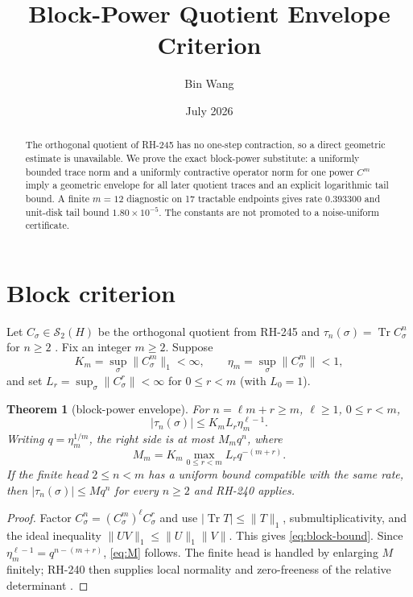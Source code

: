 \documentclass[11pt]{article}
\title{Block-Power Quotient Envelope Criterion}
\author{Bin Wang}
\date{July 2026}
\newtheorem{theorem}{Theorem}
\newcommand{\Tr}{\operatorname{Tr}}
\begin{document}
\maketitle

\begin{abstract}
The orthogonal quotient of RH-245 has no one-step contraction, so a direct
geometric estimate is unavailable.  We prove the exact block-power substitute:
a uniformly bounded trace norm and a uniformly contractive operator norm for
one power $C^m$ imply a geometric envelope for all later quotient traces and
an explicit logarithmic tail bound.  A finite $m=12$ diagnostic on 17
tractable endpoints gives rate $0.393300$ and unit-disk tail bound
$1.80\times10^{-5}$.  The constants are not promoted to a noise-uniform
certificate.
\end{abstract}

\section{Block criterion}

Let $C_\sigma\in\mathcal S_2(H)$ be the orthogonal quotient from RH-245 and
$\tau_n(\sigma)=\Tr C_\sigma^n$ for $n\ge2$ \citep{WangRH245}.  Fix an integer
$m\ge2$.  Suppose
\[
 K_m=\sup_\sigma\|C_\sigma^m\|_1<\infty,
 \qquad
 \eta_m=\sup_\sigma\|C_\sigma^m\|<1,
\]
and set $L_r=\sup_\sigma\|C_\sigma^r\|<\infty$ for
$0\le r<m$ (with $L_0=1$).

\begin{theorem}[block-power envelope]\label{thm:block}
For $n=\ell m+r\ge m$, $\ell\ge1$, $0\le r<m$,
\begin{equation}\label{eq:block-bound}
 |\tau_n(\sigma)|
 \le K_m L_r\eta_m^{\ell-1}.
\end{equation}
Writing $q=\eta_m^{1/m}$, the right side is at most $M_mq^n$, where
\begin{equation}\label{eq:M}
 M_m=K_m\max_{0\le r<m}L_rq^{-(m+r)}.
\end{equation}
If the finite head $2\le n<m$ has a uniform bound compatible with the same
rate, then $|\tau_n(\sigma)|\le Mq^n$ for every $n\ge2$ and RH-240 applies.
\end{theorem}

\begin{proof}
Factor $C_\sigma^n=(C_\sigma^m)^\ell C_\sigma^r$ and use
$|\Tr T|\le\|T\|_1$, submultiplicativity, and the ideal inequality
$\|UV\|_1\le\|U\|_1\|V\|$.  This gives \eqref{eq:block-bound}.  Since
$\eta_m^{\ell-1}=q^{n-(m+r)}$, \eqref{eq:M} follows.  The finite head is
handled by enlarging $M$ finitely; RH-240 then supplies local normality and
zero-freeness of the relative determinant \citep{WangRH240}.
\end{proof}
\end{document}
